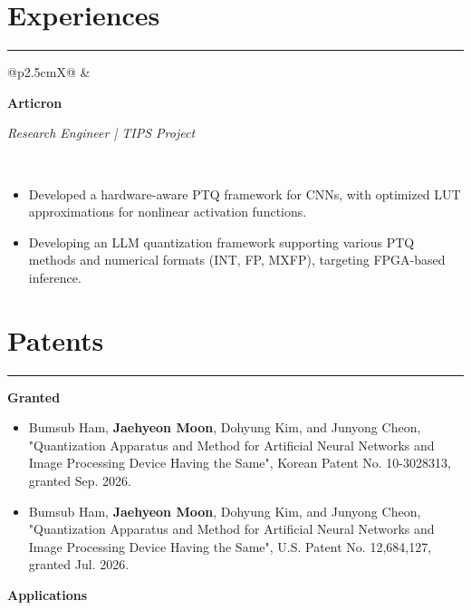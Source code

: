 \documentclass[11pt]{article}
\makeatletter
\newcommand{\cventry}[8]{%
  \noindent\begin{tabularx}{\linewidth}{@{}p{2.5cm}X@{}}
    \textcolor{Muted}{#1} &
    \begin{minipage}[t]{\linewidth}
      \textbf{#2}\par
      \textit{#3}\par
      \textit{#4}\par
      \if\relax\detokenize{#5}\relax\else \textcolor{Muted}{#5}\par\fi
      \if\relax\detokenize{#6}\relax\else \textcolor{Muted}{#6}\par\fi
      \if\relax\detokenize{#7}\relax\else \textcolor{Muted}{#7}\fi
    \end{minipage} \\
  \end{tabularx}%
  \if\relax\detokenize{#8}\relax\else #8\fi
  \vspace{6pt}%
}
\makeatother
\begin{document}
\section*{Experiences}
\hrule
\vspace{6pt}

\cventry{}
{Articron}
{Research Engineer | TIPS Project}
{}{}{}{}{}

\vspace{-8pt}

\begin{itemize}[leftmargin=2.9cm,itemsep=1pt,topsep=0pt]
    \item Developed a hardware-aware PTQ framework for CNNs, with optimized LUT approximations for nonlinear activation functions.

    \item Developing an LLM quantization framework supporting various PTQ methods and numerical formats (INT, FP, MXFP), targeting FPGA-based inference.
\end{itemize}

\section*{Patents}
\hrule
\vspace{6pt}

\textbf{Granted}

\begin{itemize}[left=0pt,itemsep=4pt,topsep=2pt]
  \item Bumsub Ham, \textbf{Jaehyeon Moon}, Dohyung Kim, and Junyong Cheon,
  "Quantization Apparatus and Method for Artificial Neural Networks and Image Processing Device Having the Same",
  Korean Patent No. 10-3028313, granted Sep. 2026.
  \item Bumsub Ham, \textbf{Jaehyeon Moon}, Dohyung Kim, and Junyong Cheon,
  "Quantization Apparatus and Method for Artificial Neural Networks and Image Processing Device Having the Same",
  U.S. Patent No. 12,684,127, granted Jul. 2026.
\end{itemize}

\vspace{4pt}

\textbf{Applications}
\end{document}
